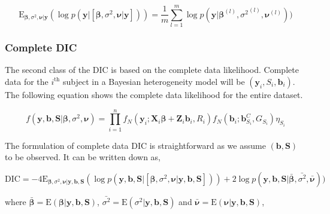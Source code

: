\begin{equation}
\label{eq : mean_posterior_deviance_approx}
\text{E}_{\boldsymbol{\beta}, \sigma^2, \boldsymbol{\nu}|\boldsymbol{y}}(\log{p(\boldsymbol{y}|[\boldsymbol{\beta}, \sigma^2, \boldsymbol{\nu}|\boldsymbol{y}])})  = \frac 1 m \sum_{l=1}^m\log{p(\boldsymbol{y}|\boldsymbol{\beta}^{(l)}, {\sigma^2}^{(l)}, \boldsymbol{\nu}^{(l)})})
\end{equation}

\subsubsection{Complete DIC}
The second class of the DIC is based on the complete data likelihood. Complete data for the $i^\text{th}$ subject in a Bayesian heterogeneity model will be $(\boldsymbol{y}_i, S_i, \boldsymbol{b}_i)$. The following equation shows the complete data likelihood for the entire dataset.

\begin{equation}
\label{eq : complete_data_likelihood}
f(\boldsymbol{y}, \boldsymbol{b}, \boldsymbol{S} | \boldsymbol{\beta}, \sigma^2, \boldsymbol{\nu}) = \prod_{i=1}^n f_N(\boldsymbol{y}_i; \boldsymbol{X}_i\boldsymbol{\beta} + \boldsymbol{Z}_i \boldsymbol{b}_i, R_i) f_N(\boldsymbol{b}_i; \boldsymbol{b}_{S_i}^C, G_{S_i}) \eta_{S_i}
\end{equation}

The formulation of complete data DIC is straightforward as we assume $(\boldsymbol{b}, \boldsymbol{S})$ to be observed. It can be written down as,

\begin{equation}
\label{eq : complete_data_dic}
\text{DIC} = -4\text{E}_{\boldsymbol{\beta}, \sigma^2, \boldsymbol{\nu}|\boldsymbol{y}, \boldsymbol{b}, \boldsymbol{S}}(\log{p(\boldsymbol{y}, \boldsymbol{b}, \boldsymbol{S}|[\boldsymbol{\beta}, \sigma^2, \boldsymbol{\nu}|\boldsymbol{y}, \boldsymbol{b}, \boldsymbol{S}])}) + 
2\log{p(\boldsymbol{y}, \boldsymbol{b}, \boldsymbol{S}|\boldsymbol{\bar{\beta}}, \bar{\sigma^2}, \boldsymbol{\bar{\nu}})})
\end{equation}

where 
$\boldsymbol{\bar{\beta}}=\text{E}(\boldsymbol{\beta}|\boldsymbol{y}, \boldsymbol{b}, \boldsymbol{S})$, 
$\bar{\sigma^2}=\text{E}(\sigma^2|\boldsymbol{y}, \boldsymbol{b}, \boldsymbol{S})$ and 
$\boldsymbol{\bar{\nu}}=\text{E}(\boldsymbol{\nu}|\boldsymbol{y}, \boldsymbol{b}, \boldsymbol{S})$,\\


